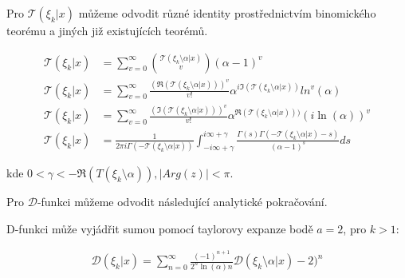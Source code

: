 \begin{lemma}
      Pro \(\mathcal{T}( \xi_k | x)\) můžeme odvodit různé identity
      prostřednictvím binomického teorému a jiných již existujících teorémů.
      
      \begin{align}
            \mathcal{T}(\xi_k| x) &= \sum_{v=0}^\infty 
            \binom{\mathcal{T}(\xi_k \setminus \alpha| 
            x)}{v}(\alpha - 1)^v \\
            \mathcal{T}(\xi_k| x) &= \sum_{v=0}^\infty 
            \frac{(\Re(\mathcal{T}(\xi_k \setminus \alpha|
            x)))^v }{v!}\alpha^{i \Im(\mathcal{T}(\xi_k 
            \setminus \alpha| x))}ln^v(\alpha) \\
            \mathcal{T}(\xi_k| x) &= \sum_{v=0}^\infty 
            \frac{(\Im(\mathcal{T}(\xi_k\setminus\alpha|
            x)))^v}{v!}\alpha^{\Re(\mathcal{T}(\xi_k
            \setminus \alpha| x)))}(i \ln(\alpha))^v \\
            \mathcal{T}(\xi_k| x) &= \frac{1}{2\pi i
            \Gamma(-\mathcal{T}(\xi_k \setminus \alpha| 
            x))}\int_{-i \infty + \gamma}^{i \infty + 
            \gamma} \frac{\Gamma(s)\Gamma(-\mathcal{T}(\xi_k
            \setminus \alpha| x) - s)}{(\alpha - 1)^s}ds  
      \end{align}
      
      kde \(0 < \gamma < - \Re(T(\xi_k \setminus 
      \alpha)), |Arg(z)| < \pi\). 
\end{lemma}

Pro \(\mathcal{D}\)-funkci můžeme odvodit
následující analytické pokračování.

\begin{theorem}
      D-funkci může vyjádřit sumou pomocí 
      taylorovy expanze bodě \(a = 2\), pro \(k >1\):

      \begin{align}
            \mathcal{D}(\xi_k | x) = \sum_{n=0}^\infty \frac{(-1)^{n+1}}{2^n 
            \ln(\alpha) n}\mathcal{D}(\xi_k \setminus \alpha | x) - 2 )^n
      \end{align}
\end{theorem}

